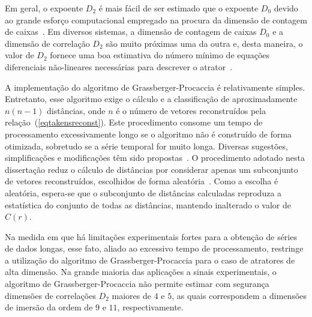 Em geral, o expoente $D_{2}$ é mais fácil de ser estimado que o expoente $D_{0}$ devido ao grande esforço computacional empregado na procura da dimensão de contagem de caixas~\cite{greenside/82}. Em diversos sistemas, a dimensão de contagem de caixas $D_{0}$ e a dimensão de correlação $D_{2}$ são muito próximas uma da outra e, desta maneira, o valor de $D_{2}$ fornece uma boa estimativa do número mínimo de equações diferenciais não-lineares necessárias para descrever o atrator~\cite{moon/97}.



A implementação do algoritmo de Grassberger-Procaccia é relativamente simples. Entretanto, esse algoritmo  exige o cálculo e a classificação de aproximadamente $n(n-1)$ distâncias, onde $n$ é o número de vetores reconstruídos pela relação~(\ref{eqtakensreconst}). Este procedimento consome um tempo de processamento  excessivamente longo se o algoritmo não é construído  de forma otimizada, sobretudo se a série temporal for muito longa. Diversas sugestões, simplificações e modificações têm sido propostas~\cite{theiler/87,parker/89,malraison/83}. O procedimento adotado nesta dissertação reduz o cálculo de distâncias por considerar apenas um subconjunto de vetores reconstruídos, escolhidos de forma aleatória~\cite{malraison/83}. Como a escolha é aleatória, espera-se que o subconjunto de distâncias calculadas reproduza a estatística do conjunto de todas as distâncias, mantendo inalterado o valor de $C(r)$.

Na medida em que há limitações experimentais fortes para a obtenção de séries de dados longas, esse fato, aliado ao excessivo tempo de processamento, restringe a utilização do algoritmo de Grassberger-Procaccia para o caso de atratores de alta dimensão. Na grande maioria das aplicações a sinais experimentais, o algoritmo de Grassberger-Procaccia não permite estimar com segurança dimensões de correlações $D_{2}$ maiores de $4$ e $5$, as quais correspondem a dimensões de imersão da ordem de $9$ e $11$, respectivamente. 

